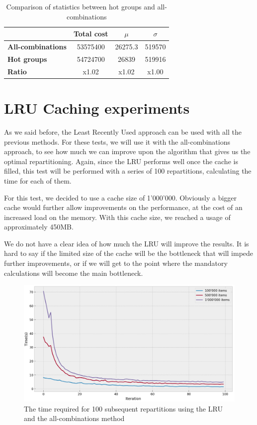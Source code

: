 \begin{table}[!htb]
  \centering
  \begin{tabular}{l c c c}
    \hline
    & \textbf{Total cost} & \textbf{$\mu$} & \textbf{$\sigma$} \\
    \hline
    \textbf{All-combinations} & 53575400 & 26275.3 & 519570\\
    \textbf{Hot groups} & 54724700 & 26839 & 519916 \\
    \hline
    \textbf{Ratio} & x1.02 & x1.02 & x1.00 \\
  \end{tabular}
  \caption{Comparison of statistics between hot groups and all-combinations}\label{tab:mean-stddev-hot-all}
\end{table}

\section{LRU Caching experiments}\label{sec:lru-caching-tests}
As we said before, the Least Recently Used approach can be used with all the previous methods. For these tests, we will use it with the all-combinations approach, to see how much we can improve upon the algorithm that gives us the optimal repartitioning. Again, since the LRU performs well once the cache is filled, this test will be performed with a series of 100 repartitions, calculating the time for each of them.

For this test, we decided to use a cache size of 1'000'000. Obviously a bigger cache would further allow improvements on the performance, at the cost of an increased load on the memory. With this cache size, we reached a usage of approximately 450MB.

We do not have a clear idea of how much the LRU will improve the results. It is hard to say if the limited size of the cache will be the bottleneck that will impede further improvements, or if we will get to the point where the mandatory calculations will become the main bottleneck.

\begin{figure}[!htb]
  \centering
  \includegraphics[width=\textwidth,height=\textheight,keepaspectratio]{img/LRU_8.png}
  \caption{The time required for 100 subsequent repartitions using the LRU and the all-combinations method }
  \label{fig:LRU_8}
\end{figure}

